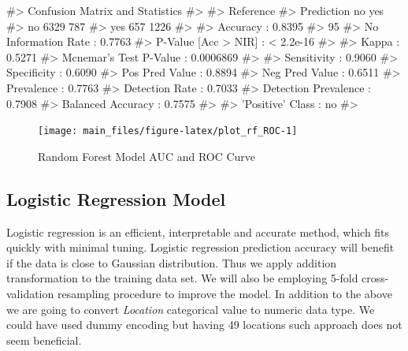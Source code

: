 \begin{Schunk}
\begin{Soutput}
#> Confusion Matrix and Statistics
#> 
#>           Reference
#> Prediction   no  yes
#>        no  6329  787
#>        yes  657 1226
#>                                           
#>                Accuracy : 0.8395          
#>                  95%
#>     No Information Rate : 0.7763          
#>     P-Value [Acc > NIR] : < 2.2e-16       
#>                                           
#>                   Kappa : 0.5271          
#>  Mcnemar's Test P-Value : 0.0006869       
#>                                           
#>             Sensitivity : 0.9060          
#>             Specificity : 0.6090          
#>          Pos Pred Value : 0.8894          
#>          Neg Pred Value : 0.6511          
#>              Prevalence : 0.7763          
#>          Detection Rate : 0.7033          
#>    Detection Prevalence : 0.7908          
#>       Balanced Accuracy : 0.7575          
#>                                           
#>        'Positive' Class : no              
#> 
\end{Soutput}
\end{Schunk}

\begin{Schunk}
\begin{figure}[H]

{\centering \texttt{[image: main\_files/figure-latex/plot\_rf\_ROC-1]} 

}

\caption[Random Forest Model AUC and ROC Curve]{Random Forest Model AUC and ROC Curve}\label{fig:plot_rf_ROC}
\end{figure}
\end{Schunk}

\hypertarget{logistic-regression-model}{%
\subsection{Logistic Regression Model}\label{logistic-regression-model}}

Logistic regression is an efficient, interpretable and accurate method,
which fits quickly with minimal tuning. Logistic regression prediction
accuracy will benefit if the data is close to Gaussian distribution.
Thus we apply addition transformation to the training data set. We will
also be employing 5-fold cross-validation resampling procedure to
improve the model. In addition to the above we are going to convert
\emph{Location} categorical value to numeric data type. We could have
used dummy encoding but having 49 locations such approach does not seem
beneficial.

